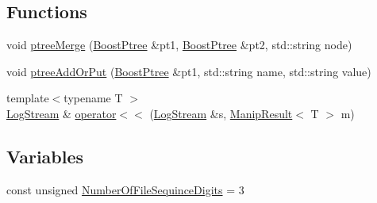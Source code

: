 \subsection*{Functions}
\begin{DoxyCompactItemize}
\item 
void \hyperlink{namespacekisscpp_a36b9e65a0a3786bd85198e4530c65bf9}{ptree\-Merge} (\hyperlink{boost__ptree_8hpp_ab36820650b8e0db36402aea80485633c}{Boost\-Ptree} \&pt1, \hyperlink{boost__ptree_8hpp_ab36820650b8e0db36402aea80485633c}{Boost\-Ptree} \&pt2, std\-::string node)
\item 
void \hyperlink{namespacekisscpp_a6bb122f9d1f472c12420a2ec59fdc287}{ptree\-Add\-Or\-Put} (\hyperlink{boost__ptree_8hpp_ab36820650b8e0db36402aea80485633c}{Boost\-Ptree} \&pt1, std\-::string name, std\-::string value)
\item 
{\footnotesize template$<$typename T $>$ }\\\hyperlink{classkisscpp_1_1_log_stream}{Log\-Stream} \& \hyperlink{namespacekisscpp_a7a056a2a9cc68e577ced326d1ebf86c1}{operator$<$$<$} (\hyperlink{classkisscpp_1_1_log_stream}{Log\-Stream} \&s, \hyperlink{classkisscpp_1_1_manip_result}{Manip\-Result}$<$ T $>$ m)
\end{DoxyCompactItemize}
\subsection*{Variables}
\begin{DoxyCompactItemize}
\item 
const unsigned \hyperlink{namespacekisscpp_a743621016edf95f7afda64b2da3bb576}{Number\-Of\-File\-Sequince\-Digits} = 3
\end{DoxyCompactItemize}


